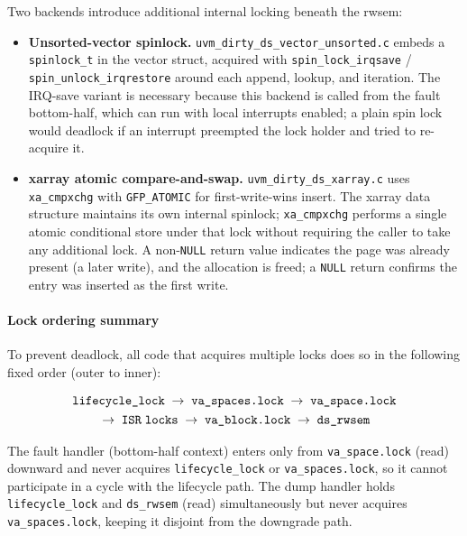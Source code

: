 Two backends introduce additional internal locking beneath the rwsem:

\begin{itemize}
    \item \textbf{Unsorted-vector spinlock.}
          \texttt{uvm\_dirty\_ds\_vector\_unsorted.c} embeds a
          \texttt{spinlock\_t} in the vector struct, acquired with
          \texttt{spin\_lock\_irqsave} / \texttt{spin\_unlock\_irqrestore}
          around each append, lookup, and iteration.
          The IRQ-save variant is necessary because this backend is called
          from the fault bottom-half, which can run with local interrupts
          enabled; a plain spin lock would deadlock if an interrupt preempted
          the lock holder and tried to re-acquire it.

    \item \textbf{xarray atomic compare-and-swap.}
          \texttt{uvm\_dirty\_ds\_xarray.c} uses \texttt{xa\_cmpxchg} with
          \texttt{GFP\_ATOMIC} for first-write-wins insert.
          The xarray data structure maintains its own internal spinlock;
          \texttt{xa\_cmpxchg} performs a single atomic conditional store
          under that lock without requiring the caller to take any
          additional lock.
          A non-\texttt{NULL} return value indicates the page was already
          present (a later write), and the allocation is freed; a
          \texttt{NULL} return confirms the entry was inserted as the first
          write.
\end{itemize}

\paragraph{Lock ordering summary}

To prevent deadlock, all code that acquires multiple locks does so in the
following fixed order (outer to inner):

\begin{multline*}
\texttt{lifecycle\_lock} \;\to\; \texttt{va\_spaces.lock} \;\to\; \texttt{va\_space.lock} \\
\;\to\; \texttt{ISR\;locks} \;\to\; \texttt{va\_block.lock} \;\to\; \texttt{ds\_rwsem}
\end{multline*}

\noindent
The fault handler (bottom-half context) enters only from
\texttt{va\_space.lock} (read) downward and never acquires
\texttt{lifecycle\_lock} or \texttt{va\_spaces.lock}, so it cannot
participate in a cycle with the lifecycle path.
The dump handler holds \texttt{lifecycle\_lock} and \texttt{ds\_rwsem}
(read) simultaneously but never acquires \texttt{va\_spaces.lock},
keeping it disjoint from the downgrade path.

